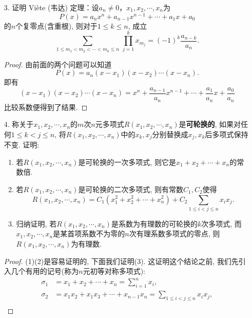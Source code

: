 \begin{1b}
\begin{enumerate}
\begin{proof}
由于\(p(z)\)在\(z\)平面上解析, 若\(p(z)\)在\(z\)平面无零点, 
则\(\frac{1}{p(z)}\)在\(z\)平面上也解析, 下面证明后者有界, 从而由Liouville定理推出矛盾. 事实上, 由于
\[\lim_{z\rightarrow\infty}p(z)=\lim_{z\rightarrow\infty}z^n\left(a_n+\frac{a_{n-1}}{z}+\cdots+\frac{a_0}{z^n}\right)=\infty,\quad\lim_{z\rightarrow\infty}\frac{1}{p(z)}=0,\]故存在充分大的正数\(R\)使得\(|z|>R\)时, \(\left|\frac{1}{p(z)}\right|<1\). 因\(\frac{1}{p(z)}\)在闭圆\(|z|\leqslant R\)上连续, 故而有界, 从而\(\frac{1}{p(z)}\)在\(z\)平面上有界, 由Liouville定理知\(\frac{1}{p(z)}\)为常数, 这不可能.
\end{proof}
\item[3.] 证明 Vi\`{e}te (韦达) 定理：设\(a_n\ne 0\)，\(x_1,x_2,\cdots,x_n\)为
\[P(x)=a_nx^n+a_{n-1}x^{n-1}+\cdots+a_1x+a_0\]
的\(n\)个复零点(含重根), 则对于\(1\leqslant k\leqslant n\), 成立 
\[\sum_{1\leqslant m_1<m_2<\cdots<m_k\leqslant n}\,\prod_{j=1}^{k}x_{m_j}=(-1)^k \frac{a_{n-k}}{a_n}.\]
\begin{proof}
由前面的两个问题可以知道\[P(x)=a_n(x-x_1)(x-x_2)\cdots(x-x_n).\]
即有\[(x-x_1)(x-x_2)\cdots(x-x_n)=x^n+\frac{a_{n-1}}{a_n}x^{n-1}+\cdots+\frac{a_1}{a_n}x+\frac{a_0}{a_n}\]比较系数便得到了结果.
\end{proof}
\item[4.] 称关于\(x_1,x_2,\cdots,x_n\)的\(m\)次\(n\)元多项式\(R(x_1,x_2,\cdots,x_n)\)是\textbf{可轮换的}, 如果对任何\(1\leqslant k<j\leqslant n\), 将\(R(x_1,x_2,\cdots,x_n)\)中的\(x_k,x_j\)分别替换成\(x_j,x_k\)后多项式保持不变. 证明: 
\begin{enumerate}[label=(\arabic*)]
\item 若\(R(x_1,x_2,\cdots,x_n)\)是可轮换的一次多项式, 则它是\(x_1+x_2+\cdots+x_n\)的常数倍.
\item 若\(R(x_1,x_2,\cdots,x_n)\)是可轮换的二次多项式, 则有常数\(C_1,C_2\)使得\[R(x_1,x_2,\cdots,x_n)=C_1(x_1^2+x_2^2+\cdots+x_n^2)+C_2\sum_{1\leqslant i<j\leqslant n }x_ix_j.\]
\item 归纳证明, 若\(R(x_1,x_2,\cdots,x_n)\)是\textcolor{green!50!black}{系数为有理数的}可轮换的\(k\)次多项式, 而\(x_1,x_2,\cdots,x_n\)是某首项系数不为零的\(n\)次有理系数多项式的零点, 则\(R(x_1,x_2,\cdots,x_n)\)为有理数.
\end{enumerate}
\begin{proof}
(1)(2)是容易证明的, 下面我们证明(3).
这证明这个结论之前, 我们先引入几个有用的记号(称为\(n\)元初等对称多项式):\[\begin{split}
\sigma_1&=x_1+x_2+\cdots+x_n=\sum_{i=1}^{n}x_i,\\
\sigma_2&=x_1x_2+x_1x_3+\cdots+x_{n-1}x_n=\sum_{1\leqslant i<j\leqslant n }x_ix_j,\\

\end{split}\]
\end{proof}
\end{enumerate}
\end{1b}

